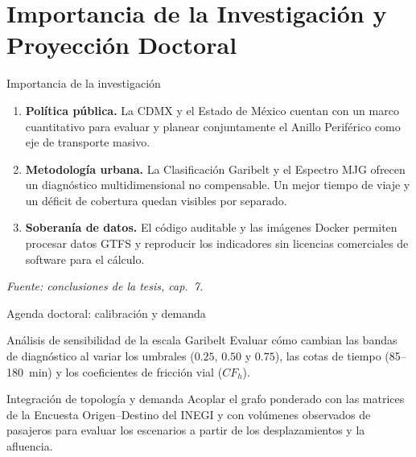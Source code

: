 
\section{Importancia de la Investigación y Proyección Doctoral}

\begin{frame}{Importancia de la investigación}
  \begin{enumerate}
    \item \textbf{Política pública.}
          La CDMX y el Estado de México cuentan con un marco cuantitativo para
          evaluar y planear conjuntamente el Anillo Periférico como eje de
          transporte masivo.

    \item \textbf{Metodología urbana.}
          La Clasificación Garibelt y el Espectro MJG ofrecen un diagnóstico
          multidimensional no compensable. Un mejor tiempo de viaje y un
          déficit de cobertura quedan visibles por separado.

    \item \textbf{Soberanía de datos.}
          El código auditable y las imágenes Docker permiten procesar datos GTFS
          y reproducir los indicadores sin licencias comerciales de software
          para el cálculo.
  \end{enumerate}

  \medskip
  {\footnotesize\itshape Fuente: conclusiones de la tesis, cap.~7.\par}
\end{frame}

\begin{frame}{Agenda doctoral: calibración y demanda}
  \begin{block}{Análisis de sensibilidad de la escala Garibelt}
    Evaluar cómo cambian las bandas de diagnóstico al variar los umbrales
    ($0.25$, $0.50$ y $0.75$), las cotas de tiempo (85--180~min) y los
    coeficientes de fricción vial ($CF_h$).
  \end{block}

  \begin{block}{Integración de topología y demanda}
    Acoplar el grafo ponderado con las matrices de la Encuesta
    Origen--Destino del INEGI y con volúmenes observados de pasajeros para
    evaluar los escenarios a partir de los desplazamientos y la afluencia.
  \end{block}
\end{frame}

